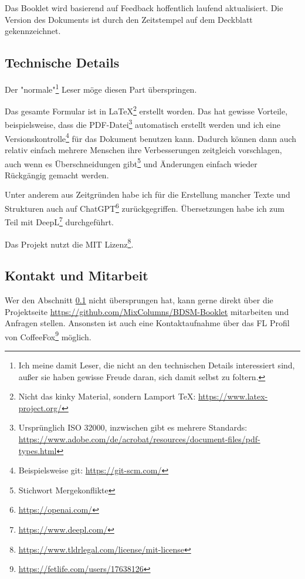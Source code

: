 \documentclass[a4paper,12pt]{article}
\begin{document}
Das Booklet wird basierend auf Feedback hoffentlich\textsuperscript{\texttrademark} laufend aktualisiert. Die Version des Dokuments ist durch den Zeitstempel auf dem Deckblatt gekennzeichnet.

\subsection{Technische Details}\label{Technische_Details}
Der "normale"\footnote{Ich meine damit Leser, die nicht an den technischen Details interessiert sind, außer sie haben gewisse Freude daran, sich damit selbst zu foltern.} Leser möge diesen Part überspringen.

Das gesamte Formular ist in \LaTeX\footnote{Nicht das kinky Material, sondern Lamport TeX: \url{https://www.latex-project.org/}} erstellt worden. Das hat gewisse Vorteile, beispielsweise, dass die PDF-Datei\footnote{Ursprünglich ISO 32000, inzwischen gibt es mehrere Standards: \url{https://www.adobe.com/de/acrobat/resources/document-files/pdf-types.html}} automatisch erstellt werden und ich eine Versionskontrolle\footnote{Beispielsweise git: \url{https://git-scm.com/}} für das Dokument benutzen kann. Dadurch können dann auch relativ einfach mehrere Menschen ihre Verbesserungen zeitgleich vorschlagen, auch wenn es Überschneidungen gibt\footnote{Stichwort Mergekonflikte} und Änderungen einfach wieder Rückgängig gemacht werden.

Unter anderem aus Zeitgründen habe ich für die Erstellung mancher Texte und Strukturen auch auf ChatGPT\footnote{\url{https://openai.com/}} zurückgegriffen. Übersetzungen habe ich zum Teil mit DeepL\footnote{\url{https://www.deepl.com/}} durchgeführt.

Das Projekt nutzt die MIT Lizenz\footnote{\url{https://www.tldrlegal.com/license/mit-license}}.

\subsection{Kontakt und Mitarbeit}
Wer den Abschnitt \ref{Technische_Details} nicht übersprungen hat, kann gerne direkt über die Projektseite \url{https://github.com/MixColumns/BDSM-Booklet} mitarbeiten und Anfragen stellen. Ansonsten ist auch eine Kontaktaufnahme über das FL Profil von CoffeeFox\footnote{\url{https://fetlife.com/users/17638126}} möglich.
\end{document}
